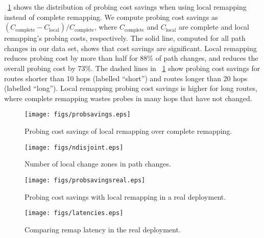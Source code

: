 
\figstr~\ref{fig:sim.savings.cmp} shows the distribution of probing cost
savings when using local remapping instead of complete remapping.  We
compute probing cost savings as $(C_\mathrm{complete} -
C_\mathrm{local})/C_\mathrm{complete}$, where $C_\mathrm{complete}$ and
$C_\mathrm{local}$ are complete and local remapping's probing costs,
respectively.  The solid line, computed for all path changes in our data
set, shows that cost savings are significant.  Local remapping reduces
probing cost by more than half for 88\% of path changes, and reduces the
overall probing cost by 73\%.  The dashed lines in
\figstr~\ref{fig:sim.savings.cmp} show probing cost savings for routes
shorter than 10 hops (labelled ``short'') and routes longer than 20 hops
(labelled ``long'').  Local remapping probing cost savings is higher for
long routes, where complete remapping wastes probes in many hops that
have not changed.


\begin{figure}
\begin{center}
\texttt{[image: figs/probsavings.eps]}
\caption{Probing cost savings of local remapping over complete
remapping.}
\label{fig:sim.savings.cmp}
\end{center}
\end{figure}

\begin{figure*}
\vspace{5mm}
\begin{minipage}{0.32\textwidth}
\texttt{[image: figs/ndisjoint.eps]}
\caption{Number of local change zones in path changes.}
\label{fig:sim.ndisjoint}
\end{minipage}
\hfill
\begin{minipage}{0.32\textwidth}
\texttt{[image: figs/probsavingsreal.eps]}
\caption{Probing cost savings with local remapping in a real
deployment.}
\label{fig:deploy.savings}
\end{minipage}
\hfill
\begin{minipage}{0.32\textwidth}
\texttt{[image: figs/latencies.eps]}
\caption{Comparing remap latency in the real deployment.}
\label{fig:deploy.latency}
\end{minipage}
\end{figure*}


